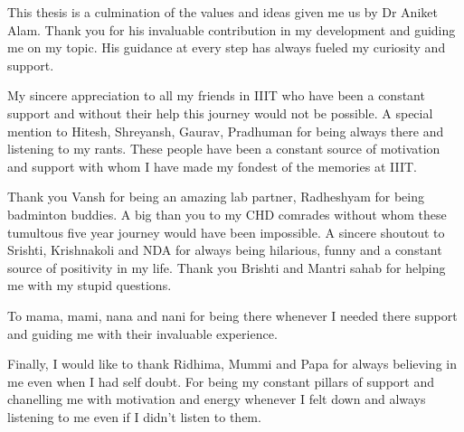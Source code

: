 This thesis is a culmination of the values and ideas given me us by Dr Aniket Alam. Thank you for his invaluable contribution in my development and guiding me on my topic. His guidance at every step has always fueled my curiosity and support.

My sincere appreciation to all my friends in IIIT who have been a constant support and without their help this journey would not be possible. A special mention to Hitesh, Shreyansh, Gaurav, Pradhuman for being always there and listening to my rants. These people have been a constant source of motivation and support with whom I have made my fondest of the memories at IIIT.

Thank you Vansh for being an amazing lab partner, Radheshyam for being badminton buddies. A big than you to my CHD comrades without whom these tumultous five year journey would have been impossible.  A sincere shoutout to Srishti, Krishnakoli and NDA for always being hilarious, funny and a constant source of positivity in my life. Thank you Brishti and Mantri sahab for helping me with my stupid questions.  

To mama, mami, nana and nani for being there whenever I needed there support and guiding me with their invaluable experience.

Finally, I would like to thank Ridhima, Mummi and Papa for always believing in me even when I had self doubt. For being my constant pillars of support and chanelling me with motivation and energy whenever I felt down and always listening to me even if I didn't listen to them. 
